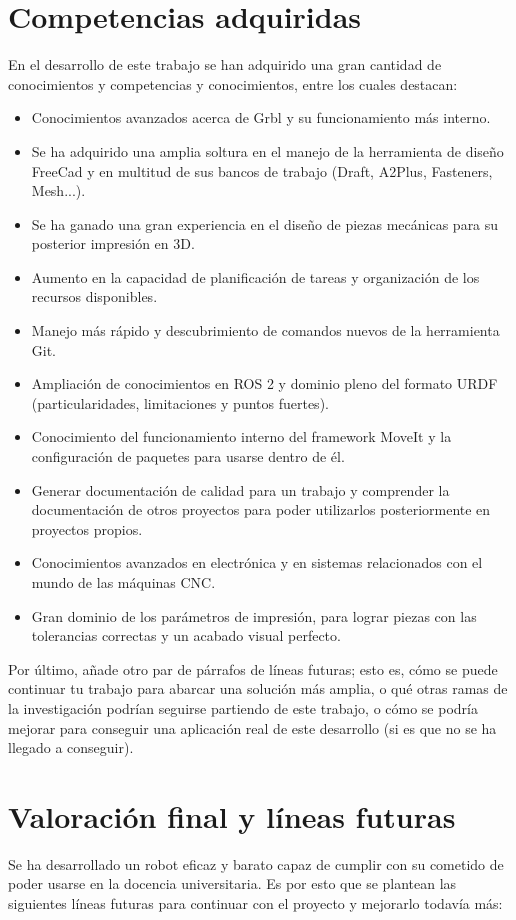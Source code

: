 \section{Competencias adquiridas}
En el desarrollo de este trabajo se han adquirido una gran cantidad de conocimientos y competencias y conocimientos, 
entre los cuales destacan:
\begin{itemize}
\item Conocimientos avanzados acerca de Grbl y su funcionamiento más interno.
\item Se ha adquirido una amplia soltura en el manejo de la herramienta de diseño FreeCad y en multitud de sus bancos de trabajo (Draft, A2Plus, Fasteners, Mesh...).
\item Se ha ganado una gran experiencia en el diseño de piezas mecánicas para su posterior impresión en 3D.
\item Aumento en la capacidad de planificación de tareas y organización de los recursos disponibles.
\item Manejo más rápido y descubrimiento de comandos nuevos de la herramienta Git.
\item Ampliación de conocimientos en ROS 2 y dominio pleno del formato URDF (particularidades, limitaciones y puntos fuertes).
\item Conocimiento del funcionamiento interno del framework MoveIt y la configuración de paquetes para usarse dentro de él.
\item Generar documentación de calidad para un trabajo y comprender la documentación de otros proyectos para poder 
utilizarlos posteriormente en proyectos propios.
\item Conocimientos avanzados en electrónica y en sistemas relacionados con el mundo de las máquinas CNC.
\item Gran dominio de los parámetros de impresión, para lograr piezas con las tolerancias correctas y un acabado visual perfecto. 
\end{itemize}

Por último, añade otro par de párrafos de líneas futuras; esto es, cómo se puede continuar tu trabajo para abarcar una solución más amplia, o qué otras ramas de la investigación podrían seguirse partiendo de este trabajo, o cómo se podría mejorar para conseguir una aplicación real de este desarrollo (si es que no se ha llegado a conseguir).
\section{Valoración final y líneas futuras}
Se ha desarrollado un robot eficaz y barato capaz de cumplir con su cometido de poder usarse en la docencia universitaria. Es por esto 
que se plantean las siguientes líneas futuras para continuar con el proyecto y mejorarlo todavía más:

